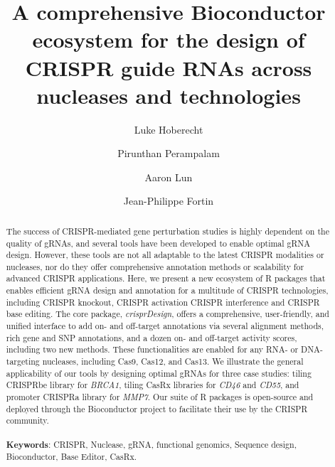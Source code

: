 \documentclass[pdftex,english,10pt]{article}
\begin{document}
\renewcommand\Affilfont{\small}


\title{A comprehensive Bioconductor ecosystem for the design of CRISPR guide RNAs across nucleases and technologies}
\author[1]{Luke Hoberecht}
\author[1]{Pirunthan Perampalam}
\author[1]{Aaron Lun}
\author[1,*]{Jean-Philippe Fortin}
\date{}



\let\oldthefootnote\thefootnote
\renewcommand{\thefootnote}{\fnsymbol{footnote}}
\let\thefootnote\oldthefootnote



\maketitle
\
\begin{abstract}
\noindent 
The success of CRISPR-mediated gene perturbation studies is highly dependent on the quality of gRNAs, and several tools have been developed to enable optimal gRNA design. 
However, these tools are not all adaptable to the latest CRISPR modalities or nucleases, nor do they offer comprehensive annotation methods or scalability for advanced CRISPR applications. 
Here, we present a new ecosystem of R packages that enables efficient gRNA design and annotation for a multitude of CRISPR technologies, including CRISPR knockout, CRISPR activation CRISPR interference and CRISPR base editing. 
The core package, \textit{crisprDesign}, offers a comprehensive, user-friendly, and unified interface to add on- and off-target annotations via several alignment methods, rich gene and SNP annotations, and a dozen on- and off-target activity scores, including two new methods. 
These functionalities are enabled for any RNA- or DNA-targeting nucleases, including Cas9, Cas12, and Cas13. 
We illustrate the general applicability of our tools by designing optimal gRNAs for three case studies: tiling CRISPRbe library for \textit{BRCA1}, tiling CasRx libraries for \textit{CD46} and \textit{CD55}, and promoter CRISPRa library for \textit{MMP7}. 
Our suite of R packages is open-source and deployed through the Bioconductor project to facilitate their use by the CRISPR community.
\\
\\
\textbf{Keywords}: CRISPR, Nuclease, gRNA, functional genomics, Sequence design, Bioconductor, Base Editor, CasRx.
 \end{abstract}
\end{document}
